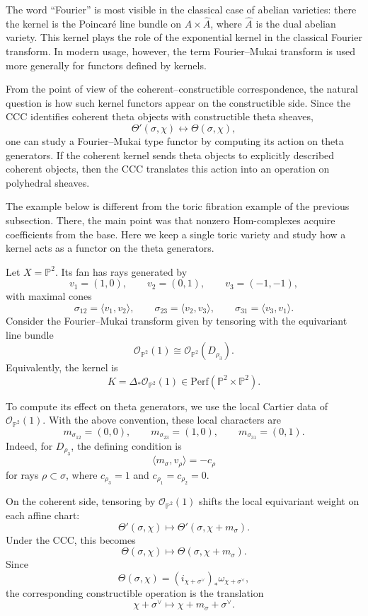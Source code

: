 The word ``Fourier'' is most visible in the classical case of abelian varieties:
there the kernel is the Poincaré line bundle on \(A\times \widehat A\), where
\(\widehat A\) is the dual abelian variety. This kernel plays the role of the
exponential kernel in the classical Fourier transform. In modern usage,
however, the term Fourier--Mukai transform is used more generally for functors
defined by kernels.

From the point of view of the coherent--constructible correspondence, the
natural question is how such kernel functors appear on the constructible side.
Since the CCC identifies coherent theta objects with constructible theta
sheaves,
\[
\Theta'(\sigma,\chi)\longleftrightarrow \Theta(\sigma,\chi),
\]
one can study a Fourier--Mukai type functor by computing its action on theta
generators. If the coherent kernel sends theta objects to explicitly described
coherent objects, then the CCC translates this action into an operation on
polyhedral sheaves.

The example below is different from the toric fibration example of the previous
subsection. There, the main point was that nonzero Hom-complexes acquire
coefficients from the base. Here we keep a single toric variety and study how a
kernel acts as a functor on the theta generators.

Let \(X=\mathbb P^2\). Its fan has rays generated by
\[
v_1=(1,0),\qquad
v_2=(0,1),\qquad
v_3=(-1,-1),
\]
with maximal cones
\[
\sigma_{12}=\langle v_1,v_2\rangle,\qquad
\sigma_{23}=\langle v_2,v_3\rangle,\qquad
\sigma_{31}=\langle v_3,v_1\rangle.
\]
Consider the Fourier--Mukai transform given by tensoring with the equivariant
line bundle
\[
\mathcal O_{\mathbb P^2}(1)\cong \mathcal O_{\mathbb P^2}(D_{\rho_3}).
\]
Equivalently, the kernel is
\[
K=\Delta_*\mathcal O_{\mathbb P^2}(1)
\in \mathrm{Perf}(\mathbb P^2\times\mathbb P^2).
\]

To compute its effect on theta generators, we use the local Cartier data of
\(\mathcal O_{\mathbb P^2}(1)\). With the above convention, these local
characters are
\[
m_{\sigma_{12}}=(0,0),\qquad
m_{\sigma_{23}}=(1,0),\qquad
m_{\sigma_{31}}=(0,1).
\]
Indeed, for \(D_{\rho_3}\), the defining condition is
\[
\langle m_\sigma,v_\rho\rangle=-c_\rho
\]
for rays \(\rho\subset\sigma\), where \(c_{\rho_3}=1\) and
\(c_{\rho_1}=c_{\rho_2}=0\).

On the coherent side, tensoring by \(\mathcal O_{\mathbb P^2}(1)\) shifts the
local equivariant weight on each affine chart:
\[
\Theta'(\sigma,\chi)
\longmapsto
\Theta'(\sigma,\chi+m_\sigma).
\]
Under the CCC, this becomes
\[
\Theta(\sigma,\chi)
\longmapsto
\Theta(\sigma,\chi+m_\sigma).
\]
Since
\[
\Theta(\sigma,\chi)
=
(i_{\chi+\sigma^\vee})_*\omega_{\chi+\sigma^\vee},
\]
the corresponding constructible operation is the translation
\[
\chi+\sigma^\vee
\longmapsto
\chi+m_\sigma+\sigma^\vee.
\]

